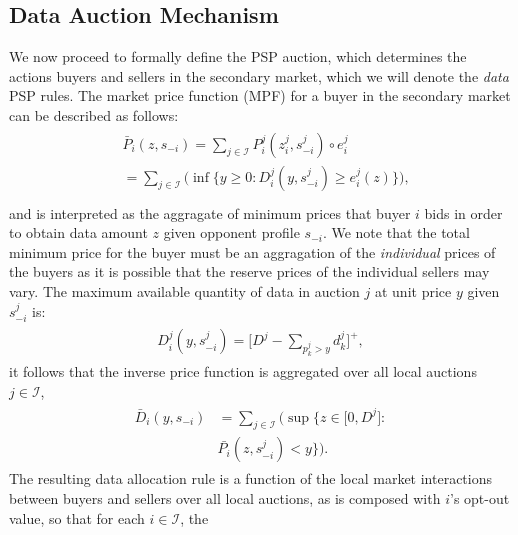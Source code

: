 \documentclass[12pt]{article}
\theoremstyle{definition}
\newcommand{\vs}{\varsigma}
\newcommand{\mcI}{\mathcal{I}}
\begin{document}
\begin{multicols}{2}
\subsection{Data Auction Mechanism}\label{mechanism}
We now proceed to formally define the PSP auction, which determines the actions 
buyers and sellers in the secondary market, which we will denote the \emph{data}
PSP rules.
The market price function (MPF) for a buyer in the secondary market
can be described as follows:
\begin{align}\label{dataprice}
\begin{split}
    &\bar{P}_i(z, s_{-i}) =\displaystyle\sum_{j\in\mcI}P_i^j(z_i^j,
s_{-i}^j) \circ e_i^j \\
    &= \sum_{j\in\mcI}\bigg(\inf\bigg\lbrace y\ge 0 : 
    {D_i^j}(y,s_{-i}^j) \ge e_i^j(z) \bigg\rbrace \bigg),\\
\end{split}
\end{align}
and is interpreted as the aggragate of minimum prices that buyer $i$ bids in
order to obtain
data amount $z$ given opponent profile $s_{-i}$. We note that
the total minimum price for the buyer must be an aggragation of the
\emph{individual} prices of the buyers as it is possible that the reserve prices of the individual sellers may vary.
The maximum available quantity of data in auction
$j$ at unit price $y$ given $s_{-i}^j$ is: 
\begin{align}
\begin{split}\label{datacomposed}
    D_i^j(y,s_{-i}^j) = \bigg\lbrack D^j - \sum_{p_k^j> y} d_k^j\bigg\rbrack^+,
\end{split}
\end{align}
it follows that the inverse price function is aggregated over all local auctions
$j\in \mcI$,
\begin{align}\label{datapriceinverse}
\begin{split}
    \bar{D}_i(y, s_{-i}) &= \displaystyle\sum_{j\in\mcI}\bigg(\sup\bigg\lbrace z\in \big[ 0,
    D^j \big] : \\
    &\bar{P_i}(z,s_{-i}^j) < y\bigg\rbrace\bigg).
\end{split}
\end{align}
The resulting data allocation rule is a function of the local market
interactions between buyers and sellers over all local auctions, as is composed with $i$'s opt-out value, so that for each $i \in \mcI$, the

\end{multicols}
\end{document}
